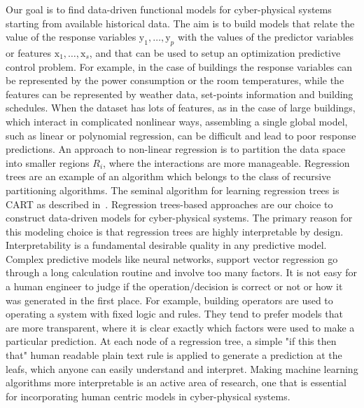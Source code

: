 \textcolor[rgb]{0.00,0.00,1.00}{Our goal is to find data-driven functional models for cyber-physical systems starting from available historical data. The aim is to build models that relate the value of the response variables $\mathrm{y}_1,\ldots,\mathrm{y}_p$ with the values of the predictor variables or features $\mathrm{x}_1,\ldots,\mathrm{x}_s$, and that can be used to setup an optimization predictive control problem. For example, in the case of buildings the response variables can be represented by the power consumption or the room temperatures, while the features can be represented by weather data, set-points information and building schedules.}
\textcolor[rgb]{1.00,0.00,0.00}{When the dataset has lots of features, as in the case of large buildings, which interact in complicated nonlinear ways, assembling a single global model, such as linear or polynomial regression, can be difficult and lead to poor response predictions. An approach to non-linear regression is to partition the data space into smaller regions $R_i$, where the interactions are more manageable. Regression trees are an example of an algorithm which belongs to the class of recursive partitioning algorithms. The seminal algorithm for learning regression trees is CART as described in~\cite{BreimanFriedmanStoneEtAl1984}. Regression trees-based approaches are our choice to construct data-driven models for cyber-physical systems. The primary reason for this modeling choice is that regression trees are highly interpretable by design. Interpretability is a fundamental desirable quality in any predictive model. Complex predictive models like neural networks, support vector regression \etc go through a long calculation routine and involve too many factors. It is not easy for a human engineer to judge if the operation/decision is correct or not or how it was generated in the first place. For example, building operators are used to operating a system with fixed logic and rules. They tend to prefer models that are more transparent, where it is clear exactly which factors were used to make a particular prediction. At each node of a regression tree, a simple "if this then that" human readable plain text rule is applied to generate a prediction at the leafs, which anyone can easily understand and interpret. Making machine learning algorithms more interpretable is an active area of research, one that is essential for incorporating human centric models in cyber-physical systems.}

